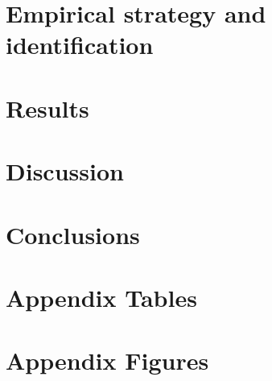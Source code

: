 \documentclass{article}
\begin{document}
\section{Empirical strategy and identification}\label{sec:empirical_strategy}
    

\section{Results}\label{sec:results}
    

\section{Discussion}\label{sec:discussion}
	

\section{Conclusions}\label{sec:conclusion}
    

 


\clearpage
\printbibliography


\clearpage

\section*{}
\vspace{5mm}

\appendix

\renewcommand\thetable{\thesection.\arabic{table}}    
\renewcommand\thefigure{\thesection.\arabic{figure}} 
\setcounter{table}{0}
\setcounter{figure}{0}

\section{Appendix Tables}
	

\clearpage
\section{Appendix Figures}
	
\end{document}
